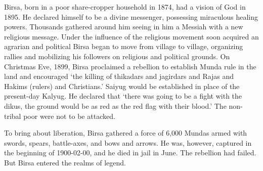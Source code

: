 \begin{multicols}{2}
Birsa, born in a poor share-cropper household in 1874, had a vision of God in 1895. He declared himself to be a divine messenger, possessing miraculous healing powers. Thousands gathered around him seeing in him a Messiah with a new religious message. Under the influence of the religious movement soon acquired an agrarian and political Birsa began to move from village to village, organizing rallies and mobilizing his followers on religious and political grounds. On Christmas Eve, 1899, Birsa proclaimed a rebellion to establish Munda rule in the land and encouraged `the killing of thikadars and jagirdars and Rajas and Hakims (rulers) and Christians.' Saiyug would be established in place of the present-day Kalyug. He declared that `there was going to be a fight with the dikus, the ground would be as red as the red flag with their blood.' The non-tribal poor were not to be attacked.

To bring about liberation, Birsa gathered a force of 6,000 Mundas armed with swords, spears, battle-axes, and bows and arrows. He was, however, captured in the beginning of 1900-02-00, and he died in jail in June. The rebellion had failed. But Birsa entered the realms of legend.
\end{multicols}